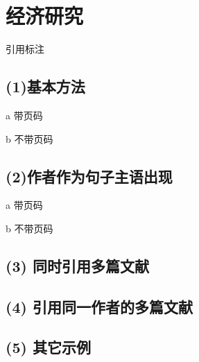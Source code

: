 \documentclass[twoside]{article}
\begin{document}
    \section{经济研究}

引用标注

\subsection*{(1)基本方法}

a 带页码

\cite[第34页]{吕捷2015cpi}

\cite[p.55]{bernanke1989agency}


b 不带页码

\cite{吕捷2015cpi}

\cite{bernanke1989agency}

\subsection*{(2)作者作为句子主语出现}

a 带页码

\textcite[第34页]{吕捷2015cpi}

b 不带页码

\textcite{吕捷2015cpi}

\subsection*{(3) 同时引用多篇文献}

\cite{吕捷2015cpi,方军雄2007所有制,李晓西1994转轨过程中的结构性通货膨胀}

\textcite{吕捷2015cpi,方军雄2007所有制,bernanke1989agency}

\subsection*{(4) 引用同一作者的多篇文献}

\cite{杨光2010经济波动,杨光2015经济波动,杨光2015经济波动b,杨光2017经济波动}

\subsection*{(5) 其它示例}

\cite{杨光2015经济波动,杨光2015经济波动b,方军雄2007所有制,李晓西1994转轨过程中的结构性通货膨胀,刘凤良2017}

\cite{约翰1978--}
\cite{John1978--}
\cite{李四1991--,李四1991b--}
\cite{曾约翰1978--}
\cite{Carlson2000}
\nocite{*}

    \printbibliography

    
\end{document}
